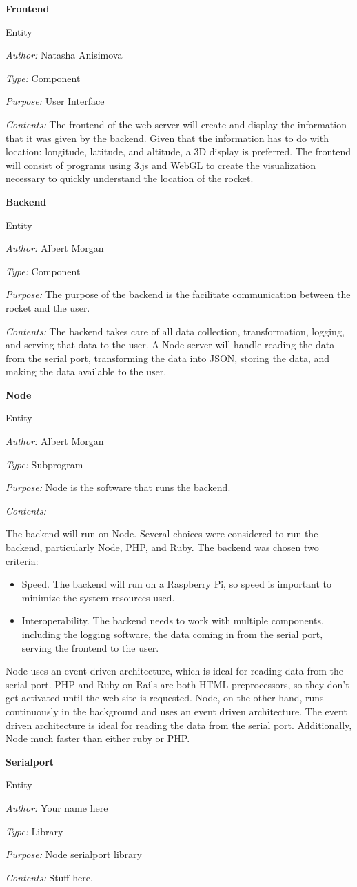 \documentclass[10pt,draftclsnofoot,onecolumn]{IEEEtran}
\newcommand{\newentity}[5]{
	\begin{minipage}{\linewidth}
	\noindent\textbf{#2}
	
	\noindent Entity
	
	\noindent\textit{Author:} {#1}
		
	\noindent\textit{Type:} {#3}
	
	\noindent\textit{Purpose:} {#4}
	
	\noindent\textit{Contents:} {#5}
	\vspace{.5cm}
	\end{minipage}
}
\begin{document}
	\newentity
	{Natasha Anisimova}
	{Frontend}
	{Component}
	{User Interface}
	{
		The frontend of the web server will create and display the information that it was given by the backend. Given
		that the information has to do with location: longitude, latitude, and altitude, a 3D display is preferred. The
		frontend will consist of programs using 3.js and WebGL to create the visualization necessary to quickly understand the
		location of the rocket.
	}

	\newentity
	{Albert Morgan}
	{Backend}
	{Component}
	{
		The purpose of the backend is the facilitate communication between the rocket and the user.
	}
	{
		The backend takes care of all data collection, transformation, logging, and serving that data to the user.
		A Node server will handle reading the data from the serial port, transforming the data into JSON,
		storing the data, and making the data available to the user.
	}

	\newentity
	{Albert Morgan}
	{Node}
	{Subprogram}
	{Node is the software that runs the backend.}
	{
		The backend will run on Node. Several choices were considered to run the backend, particularly Node, PHP, and Ruby.
		The backend was chosen two criteria:
		\begin{itemize}
			\item Speed. The backend will run on a Raspberry Pi, so speed is important to minimize the system resources used.
			\item Interoperability. The backend needs to work with multiple components, including the logging software, the data coming in from the serial port, serving the frontend to the user.
		\end{itemize}
		Node uses an event driven architecture, which is ideal for reading data from the serial port.
		PHP and Ruby on Rails are both HTML preprocessors, so they don't get activated until the web site is requested.
		Node, on the other hand, runs continuously in the background and uses an event driven architecture.
		The event driven architecture is ideal for reading the data from the serial port.
		Additionally, Node much faster than either ruby or PHP.	
	}

	\newentity
	{Your name here}
	{Serialport}
	{Library}
	{Node serialport library}
	{Stuff here.}
\end{document}
